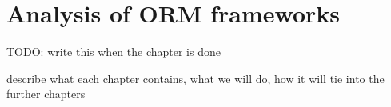 \chapter{Analysis of ORM frameworks}

TODO: write this when the chapter is done

describe what each chapter contains, what we will do, how it will tie into the further chapters







